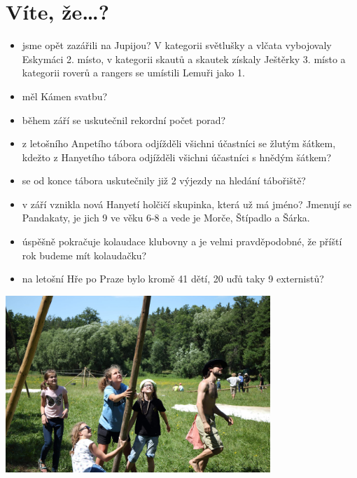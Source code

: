 \chapter{Víte, že…?} %
\label{cha:vite}
	
\begin{itemize}
	\item jsme opět zazářili na Jupijou? V kategorii světlušky a vlčata vybojovaly Eskymáci 2. místo, v kategorii skautů a skautek získaly Ještěrky 3. místo a kategorii roverů a rangers se umístili Lemuři jako 1.

	\item měl Kámen svatbu?
	\item během září se uskutečnil rekordní počet porad?
	\item z letošního Anpetího tábora odjížděli všichni účastníci se žlutým šátkem, kdežto z Hanyetího tábora odjížděli všichni účastníci s hnědým šátkem?
	\item se od konce tábora uskutečnily již 2 výjezdy na hledání tábořiště?
	\item v září vznikla nová Hanyetí holčičí skupinka, která už má jméno? Jmenují se Pandakaty, je jich 9 ve věku 6-8 a vede je Morče, Štípadlo a Šárka.
	\item úspěšně pokračuje kolaudace klubovny a je velmi pravděpodobné, že příští rok budeme mít kolaudačku?
	\item na letošní Hře po Praze bylo kromě 41 dětí, 20 uďů taky 9 externistů?

\end{itemize}


\vfil 

\begin{center}

\includegraphics[width=10cm]{img/stavba_typi.jpg}

\end{center}


\clearpage
